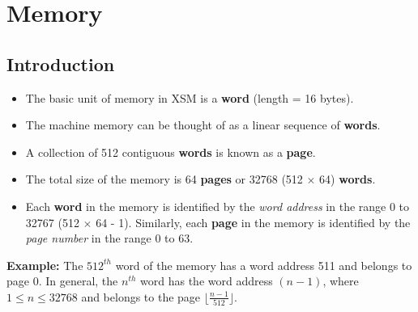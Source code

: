 \documentclass[11pt]{article}
\begin{document}
\section{Memory}
\label{sec:mem}

\subsection{Introduction}


\begin{itemize}
\item The basic unit of memory in XSM is a \textbf{word} (length = 16 bytes).
\item The machine memory can be thought of as a linear sequence of \textbf{words}.
\item A collection of 512 contiguous \textbf{words} is known as a \textbf{page}.
\item The total size of the memory is 64 \textbf{pages} or 32768 (512 $\times$ 64) \textbf{words}.
\item Each \textbf{word} in the memory is identified by the \textit{word address} in the range 0 to 32767 (512 $\times$ 64 - 1). Similarly, each \textbf{page} in the memory is identified by the \textit{page number} in the range 0 to 63.
\end{itemize}

\textbf{Example:} The $512^{th}$ word of the memory has a word address 511 and belongs to page 0. In general, the $n^{th}$ word has the word address $(n-1)$, where  $1 \le n \le 32768$ and belongs to the page $\lfloor \frac{n-1}{512} \rfloor$. 
\end{document}
